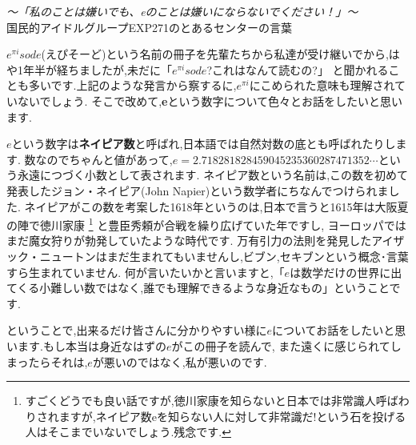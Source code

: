 


\begin{flushright}
\textit {〜「私のことは嫌いでも、eのことは嫌いにならないでください！」〜}\\
国民的アイドルグループEXP271のとあるセンターの言葉
\end{flushright}

$e^{\pi i}sode$(えぴそーど)という名前の冊子を先輩たちから私達が受け継いでから,はや1年半が経ちましたが,未だに「$e^{\pi i}sode$?これはなんて読むの?」
と聞かれることも多いです.上記のような発言から察するに,$e^{\pi i}$にこめられた意味も理解されていないでしょう.
そこで改めて,{\bf e}という数字について色々とお話をしたいと思います.\par
$e$という数字は{\bf ネイピア数}と呼ばれ,日本語では自然対数の底とも呼ばれたりします.
数なのでちゃんと値があって,$e = 2.718281828459045235360287471352\cdots$という永遠につづく小数として表されます.
ネイピア数という名前は,この数を初めて発表したジョン・ネイピア(John Napier)という数学者にちなんでつけられました.
ネイピアがこの数を考案した1618年というのは,日本で言うと1615年は大阪夏の陣で徳川家康
\footnote{すごくどうでも良い話ですが,徳川家康を知らないと日本では非常識人呼ばわりされますが,ネイピア数eを知らない人に対して非常識だ!という石を投げる人はそこまでいないでしょう.残念です.} と豊臣秀頼が合戦を繰り広げていた年ですし,
ヨーロッパではまだ魔女狩りが勃発していたような時代です.
万有引力の法則を発見したアイザック・ニュートンはまだ生まれてもいませんし,ビブン,セキブンという概念･言葉すら生まれていません.
何が言いたいかと言いますと,「$e$は数学だけの世界に出てくる小難しい数ではなく,誰でも理解できるような身近なもの」ということです.\par
ということで,出来るだけ皆さんに分かりやすい様に$e$についてお話をしたいと思います.もし本当は身近なはずの$e$がこの冊子を読んで,
また遠くに感じられてしまったらそれは,$e$が悪いのではなく,私が悪いのです.

